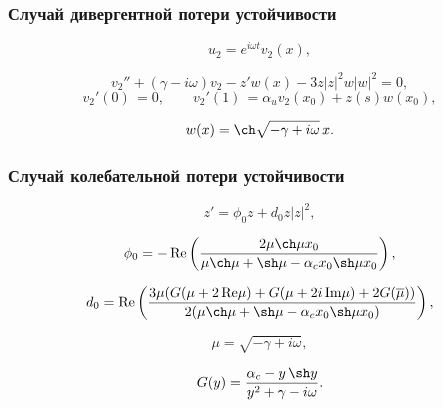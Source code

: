 \documentclass[fullscreen=true, unicode, bookmarks=false]{beamer}
\begin{document}
\begin{frame}
\frametitle{ Случай дивергентной потери устойчивости }

$$ u_2 = e^{i \omega t} v_2(x), $$

\bigskip
\pause

\begin{equation}
	v_2'' + (\gamma - i \omega) v_2 - z' w(x) - 3z|z|^2 w|w|^2 = 0,
\end{equation}
\begin{equation}
	v_2'(0) \, = 0, \qquad v_2'(1) \, = \alpha_u v_2(x_0) + z(s) w(x_0),
\end{equation}

$$ w(x) = \ch \sqrt{-\gamma + i \omega} \, x. $$

\end{frame}

\begin{frame}
\frametitle{ Случай колебательной потери устойчивости }

\begin{equation}
	z' = \phi_0 z + d_0 z |z|^2,
\end{equation}

\bigskip
\pause

$$ \phi_0 = -\operatorname{Re} \left( \frac{ 2 \mu \ch \mu x_0 }{ \mu \ch \mu +\sh \mu - \alpha_c x_0 \sh \mu x_0 } \right), $$

$$ d_0 = \operatorname{Re} \left( \frac{ 3 \mu ( G(\mu + 2\,\mbox{Re}\mu) + G(\mu + 2i\,\mbox{Im}\mu) + 2G(\overline{\mu}) ) }{ 2 ( \mu \ch \mu +\sh \mu - \alpha_c x_0 \sh \mu x_0 ) } \right), $$

$$ \mu = \sqrt{-\gamma + i \omega}, $$

$$ G(y) = \frac{ \alpha_c - y\,\sh y }{ y^2 + \gamma - i\omega }. $$

\end{frame}
\end{document}
